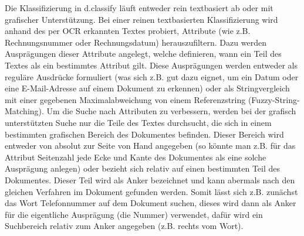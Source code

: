 \documentclass{whswinvcbook}
\begin{document}
Die Klassifizierung in d.classify läuft entweder rein textbasiert ab oder mit grafischer Unterstützung. Bei einer reinen textbasierten Klassifizierung wird anhand des per OCR erkannten Textes probiert, Attribute (wie z.B. Rechnungsnummer oder Rechnungsdatum) herauszufiltern. Dazu werden Ausprägungen dieser Attribute angelegt, welche definieren, wann ein Teil des Textes als ein bestimmtes Attribut gilt. Diese Ausprägungen werden entweder als reguläre Ausdrücke formuliert (was sich z.B. gut dazu eignet, um ein Datum oder eine E-Mail-Adresse auf einem Dokument zu erkennen) oder als Stringvergleich mit einer gegebenen Maximalabweichung von einem Referenzstring (Fuzzy-String-Matching). Um die Suche nach Attributen zu verbessern, werden bei der grafisch unterstützten Suche nur die Teile des Textes durchsucht, die sich in einem bestimmten grafischen Bereich des Dokumentes befinden. Dieser Bereich wird entweder von absolut zur Seite von Hand angegeben (so könnte man z.B. für das Attribut Seitenzahl jede Ecke und Kante des Dokumentes als eine solche Ausprägung anlegen) oder bezieht sich relativ auf einen bestimmten Teil des Dokumentes. Dieser Teil wird als Anker bezeichnet und kann abermals nach den gleichen Verfahren im Dokument gefunden werden. Somit lässt sich z.B. zunächst das Wort Telefonnummer auf dem Dokument suchen, dieses wird dann als Anker für die eigentliche Ausprägung (die Nummer) verwendet, dafür wird ein Suchbereich relativ zum Anker angegeben (z.B. rechts vom Wort).
\end{document}
